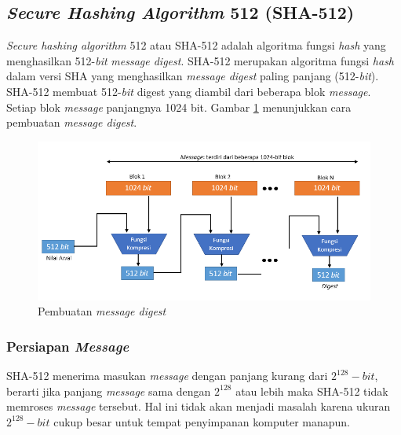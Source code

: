 \subsection{\textit{Secure Hashing Algorithm} 512 (SHA-512)}
\label{subsec:SHA512}
\textit{Secure hashing algorithm} 512 atau SHA-512 adalah algoritma fungsi \textit{hash} yang menghasilkan 512-\textit{bit} \textit{message digest}. SHA-512 merupakan algoritma fungsi \textit{hash} dalam versi SHA yang menghasilkan \textit{message digest} paling panjang (512-\textit{bit}). SHA-512 membuat 512-\textit{bit} digest yang diambil dari beberapa blok \textit{message}. Setiap blok \textit{message} panjangnya 1024 bit. Gambar \ref{fig:digestcreate} menunjukkan cara pembuatan \textit{message digest}.

\begin{figure}[H]
	\includegraphics[scale=0.8]{Gambar/digest_creation}
	\caption{Pembuatan \textit{message digest}}\label{fig:digestcreate}
\end{figure}

\subsubsection{Persiapan \textit{Message}}
\label{sssec:persiapan_message}
SHA-512 menerima masukan \textit{message} dengan panjang kurang dari \begin{math}2^{128}-\textit{bit}\end{math}, berarti jika panjang \textit{message} sama dengan \begin{math}2^{128}\end{math} atau lebih maka SHA-512 tidak memroses \textit{message} tersebut. Hal ini tidak akan menjadi masalah karena ukuran \begin{math}2^{128}-\textit{bit}\end{math} cukup besar untuk tempat penyimpanan komputer manapun.

